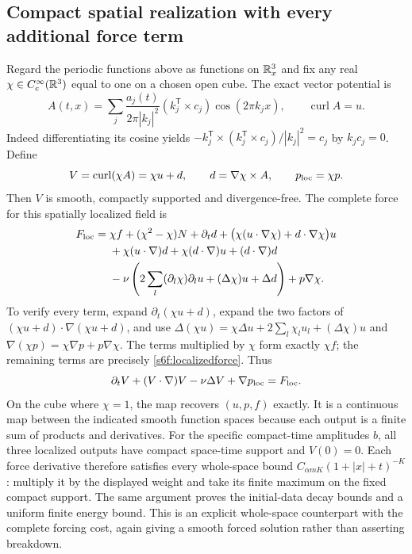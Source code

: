 \subsection{Compact spatial realization with every additional force term}
\label{s6f:localization}
Regard the periodic functions above as functions on $\mathbb R_x^3$ and
fix any real $\chi\in C_c^\infty(\mathbb R^3)$ equal to one on a chosen
open cube. The exact vector potential is
\[
 A(t,x)=\sum_j\frac{a_j(t)}{2\pi|k_j|^2}
              (k_j^{\mathsf T}\times c_j)\cos(2\pi k_jx),
 \qquad \operatorname{curl}A=u.
\]
Indeed differentiating its cosine yields
$-k_j^{\mathsf T}\times(k_j^{\mathsf T}\times c_j)/|k_j|^2=c_j$
by $k_jc_j=0$. Define
\[
 V=\operatorname{curl}(\chi A)=\chi u+d,
 \qquad d=\nabla\chi\times A,
 \qquad p_{\rm loc}=\chi p.
\]
Then $V$ is smooth, compactly supported and divergence-free. The
complete force for this spatially localized field is
\begin{align}
 F_{\rm loc}={}&\chi f+(\chi^2-\chi)N+\partial_td
       +\bigl(\chi(u\cdot\nabla\chi)+d\cdot\nabla\chi\bigr)u
       \notag\\
 &+\chi(u\cdot\nabla)d+\chi(d\cdot\nabla)u+(d\cdot\nabla)d
       \notag\\
 &-\nu\left(2\sum_l(\partial_l\chi)\partial_lu
               +(\Delta\chi)u+\Delta d\right)+p\nabla\chi.
 \label{s6f:localizedforce}
\end{align}
To verify every term, expand
$\partial_t(\chi u+d)$, expand the two factors of
$(\chi u+d)\cdot\nabla(\chi u+d)$, and use
$\Delta(\chi u)=\chi\Delta u+2\sum_l\chi_lu_l+(\Delta\chi)u$
and $\nabla(\chi p)=\chi\nabla p+p\nabla\chi$.
The terms multiplied by $\chi$ form exactly $\chi f$; the remaining
terms are precisely \eqref{s6f:localizedforce}. Thus
\[
 \partial_tV+(V\cdot\nabla)V-\nu\Delta V+\nabla p_{\rm loc}
        =F_{\rm loc}.
\]
On the cube where $\chi=1$, the map recovers $(u,p,f)$ exactly.
It is a continuous map between the indicated smooth function spaces
because each output is a finite sum of products and derivatives.
For the specific compact-time amplitudes $b$, all three localized
outputs have compact space-time support and $V(0)=0$. Each force
derivative therefore satisfies every whole-space bound
$C_{\alpha mK}(1+|x|+t)^{-K}$: multiply it by the displayed weight
and take its finite maximum on the fixed compact support. The same
argument proves the initial-data decay bounds and a uniform finite
energy bound. This is an explicit whole-space counterpart with the
complete forcing cost, again giving a smooth forced solution rather
than asserting breakdown.
